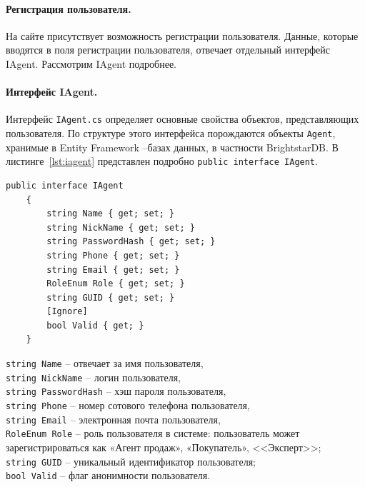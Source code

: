 \documentclass[a4paper,14pt,openany,final]{extreport} %
\def\oldcaption{} \let\oldcaption=\caption
\def\caption{\stepcounter{captionsnum}\oldcaption}
\begin{document}
{\paragraph{Регистрация пользователя.}
На сайте присутствует возможность регистрации пользователя. Данные, которые вводятся в поля регистрации пользователя, отвечает отдельный интерфейс IAgent. Рассмотрим IAgent подробнее.

\paragraph{Интерфейс IAgent.}
Интерфейс \verb|IAgent.cs| определяет основные свойства объектов, представляющих пользователя. По структуре этого интерфейса порождаются объекты \verb|Agent|, хранимые в \foreignlanguage{english}{Entity Framework} --\;базах данных, в частности BrightstarDB. В листинге~\ref{lst:iagent} представлен подробно \verb|public interface IAgent|.
\begin{pzlisting}
\caption{Интерфейс регистрации пользователя}\label{lst:iagent}
\begin{verbatim}
public interface IAgent
    {
        string Name { get; set; }
        string NickName { get; set; }
        string PasswordHash { get; set; }
        string Phone { get; set; }
        string Email { get; set; }
        RoleEnum Role { get; set; }
        string GUID { get; set; }
        [Ignore]
        bool Valid { get; }
    }
\end{verbatim}
\end{pzlisting}

\noindent\verb|string Name| – отвечает за имя пользователя,\\
\verb|string NickName| – логин пользователя,\\
\verb|string PasswordHash| – хэш пароля пользователя,\\
\verb|string Phone| – номер сотового телефона пользователя,\\
\verb|string Email| – электронная почта пользователя,\\
\verb|RoleEnum Role| – роль пользователя в системе: пользователь может зарегистрироваться как «Агент продаж», «Покупатель», <<Эксперт>>;\\
\verb|string GUID| – уникальный идентификатор пользователя;\\
\verb|bool Valid| – флаг анонимности пользователя.

}
\end{document}

